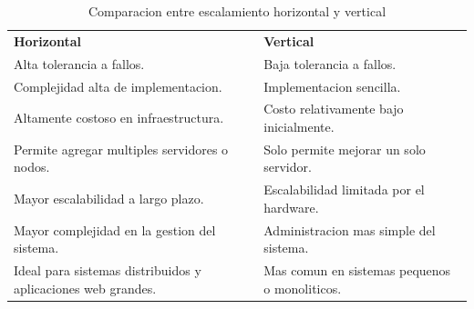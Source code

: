\documentclass[11pt]{article}
\begin{document}
\begin{table}[h]
\centering
\begin{tabular}{p{8cm} p{8cm}}
\textbf{Horizontal} & \textbf{Vertical} \\[6pt]

Alta tolerancia a fallos. &
Baja tolerancia a fallos. \\

Complejidad alta de implementacion. &
Implementacion sencilla. \\

Altamente costoso en infraestructura. &
Costo relativamente bajo inicialmente. \\

Permite agregar multiples servidores o nodos. &
Solo permite mejorar un solo servidor. \\

Mayor escalabilidad a largo plazo. &
Escalabilidad limitada por el hardware. \\

Mayor complejidad en la gestion del sistema. &
Administracion mas simple del sistema. \\

Ideal para sistemas distribuidos y aplicaciones web grandes. &
Mas comun en sistemas pequenos o monoliticos. \\

\end{tabular}
\caption{Comparacion entre escalamiento horizontal y vertical}
\end{table}
\end{document}
